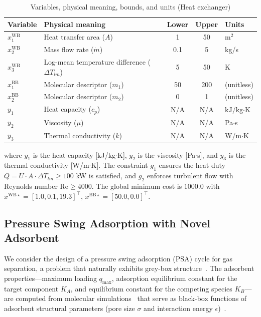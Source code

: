 \documentclass[12pt,a4paper]{article}%
\theoremstyle{plain}%
\theoremstyle{remark}%
\theoremstyle{definition}%
\def\WB{\mathrm{WB}}
\def\BB{\mathrm{BB}}
\begin{document}
\begin{appendices}
\begin{table}[htbp]
\centering
\caption{Variables, physical meaning, bounds, and units (Heat exchanger)}
\label{tab:heat_exchanger_vars}
\begin{tabular}{@{}llccl@{}}
\toprule
Variable & Physical meaning & Lower & Upper & Units \\
\midrule
$x^{\WB}_1$ & Heat transfer area ($A$) & 1 & 50 & m$^2$ \\
$x^{\WB}_2$ & Mass flow rate ($\dot{m}$) & 0.1 & 5 & kg/s \\
$x^{\WB}_3$ & Log-mean temperature difference ($\Delta T_{lm}$) & 5 & 50 & K \\
\midrule
$x^{\BB}_1$ & Molecular descriptor ($m_1$) & 50 & 200 & (unitless) \\
$x^{\BB}_2$ & Molecular descriptor ($m_2$) & 0 & 1 & (unitless) \\
\midrule
$y_1$ & Heat capacity ($c_p$) & N/A & N/A & kJ/kg$\cdot$K \\
$y_2$ & Viscosity ($\mu$) & N/A & N/A & Pa$\cdot$s \\
$y_3$ & Thermal conductivity ($k$) & N/A & N/A & W/m$\cdot$K \\
\bottomrule
\end{tabular}
\end{table}

where $y_1$ is the heat capacity [kJ/kg$\cdot$K], $y_2$ is the viscosity [Pa$\cdot$s], and $y_3$ is the thermal conductivity [W/m$\cdot$K]. The constraint $g_1$ ensures the heat duty $Q = U \cdot A \cdot \Delta T_{lm} \geq 100$ kW is satisfied, and $g_2$ enforces turbulent flow with Reynolds number $\text{Re} \geq 4000$. The global minimum cost is $1000.0$ with $x^{\WB\star} = [1.0, 0.1, 19.3]^\top$, $x^{\BB\star} = [50.0, 0.0]^\top$.

\subsection{Pressure Swing Adsorption with Novel Adsorbent}\label{subsec:app_psa}

We consider the design of a pressure swing adsorption (PSA) cycle for gas separation, a problem that naturally exhibits grey-box structure~\cite{boukouvala2017argonaut,agarwal2010superstructure,ruthven1994psa}. The adsorbent properties---maximum loading $q_{\max}$, adsorption equilibrium constant for the target component $K_A$, and equilibrium constant for the competing species $K_B$---are computed from molecular simulations~\cite{burns2020process,smit2008molecular} that serve as black-box functions of adsorbent structural parameters (pore size $\sigma$ and interaction energy $\epsilon$)~\cite{dubbeldam2019force}.


\end{appendices}
\end{document}
